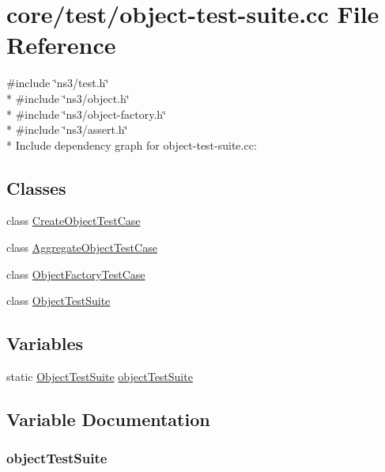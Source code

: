 \hypertarget{object-test-suite_8cc}{}\section{core/test/object-\/test-\/suite.cc File Reference}
\label{object-test-suite_8cc}
{\ttfamily \#include \char`\"{}ns3/test.\+h\char`\"{}}\\*
{\ttfamily \#include \char`\"{}ns3/object.\+h\char`\"{}}\\*
{\ttfamily \#include \char`\"{}ns3/object-\/factory.\+h\char`\"{}}\\*
{\ttfamily \#include \char`\"{}ns3/assert.\+h\char`\"{}}\\*
Include dependency graph for object-\/test-\/suite.cc\+:
\subsection*{Classes}
\begin{DoxyCompactItemize}
\item 
class \hyperlink{classCreateObjectTestCase}{Create\+Object\+Test\+Case}
\item 
class \hyperlink{classAggregateObjectTestCase}{Aggregate\+Object\+Test\+Case}
\item 
class \hyperlink{classObjectFactoryTestCase}{Object\+Factory\+Test\+Case}
\item 
class \hyperlink{classObjectTestSuite}{Object\+Test\+Suite}
\end{DoxyCompactItemize}
\subsection*{Variables}
\begin{DoxyCompactItemize}
\item 
static \hyperlink{classObjectTestSuite}{Object\+Test\+Suite} \hyperlink{object-test-suite_8cc_a102ae42341b72b6456ac3b9f7866edaa}{object\+Test\+Suite}
\end{DoxyCompactItemize}


\subsection{Variable Documentation}
\subsubsection[{\texorpdfstring{object\+Test\+Suite}{objectTestSuite}}]{ object\+Test\+Suite\hspace{0.3cm}{\ttfamily [static]}}\hypertarget{object-test-suite_8cc_a102ae42341b72b6456ac3b9f7866edaa}{}\label{object-test-suite_8cc_a102ae42341b72b6456ac3b9f7866edaa}
